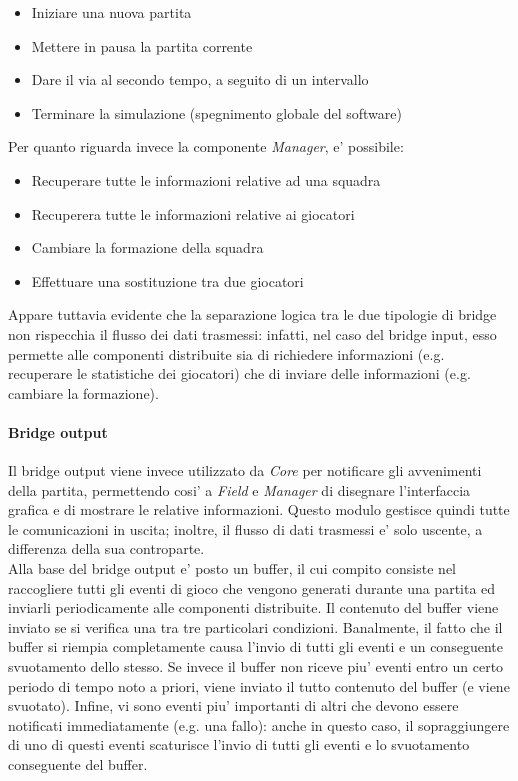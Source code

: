 \begin{itemize}
	\item Iniziare una nuova partita
	\item Mettere in pausa la partita corrente
	\item Dare il via al secondo tempo, a seguito di un intervallo
	\item Terminare la simulazione (spegnimento globale del software)
\end{itemize}

\noindent Per quanto riguarda invece la componente \textit{Manager}, e' possibile:

\begin{itemize}
	\item Recuperare tutte le informazioni relative ad una squadra
	\item Recuperera tutte le informazioni relative ai giocatori
	\item Cambiare la formazione della squadra
	\item Effettuare una sostituzione tra due giocatori
\end{itemize}

Appare tuttavia evidente che la separazione logica tra le due tipologie di bridge non rispecchia il flusso dei dati trasmessi: infatti, nel caso del bridge input, esso permette alle componenti distribuite sia di richiedere informazioni (e.g. recuperare le statistiche dei giocatori) che di inviare delle informazioni (e.g. cambiare la formazione).\\

\paragraph{Bridge output}\label{sec:analisi_distribuzione_bridge_output} Il bridge output viene invece utilizzato da \textit{Core} per notificare gli avvenimenti della partita, permettendo cosi' a \textit{Field} e \textit{Manager} di disegnare l'interfaccia grafica e di mostrare le relative informazioni. Questo modulo gestisce quindi tutte le comunicazioni in uscita; inoltre, il flusso di dati trasmessi e' solo uscente, a differenza della sua controparte.\\

Alla base del bridge output e' posto un buffer, il cui compito consiste nel raccogliere tutti gli eventi di gioco che vengono generati durante una partita ed inviarli periodicamente alle componenti distribuite. Il contenuto del buffer viene inviato se si verifica una tra tre particolari condizioni. Banalmente, il fatto che il buffer si riempia completamente causa l'invio di tutti gli eventi e un conseguente svuotamento dello stesso. Se invece il buffer non riceve piu' eventi entro un certo periodo di tempo noto a priori, viene inviato il tutto contenuto del buffer (e viene svuotato). Infine, vi sono eventi piu' importanti di altri che devono essere notificati immediatamente (e.g. una fallo): anche in questo caso, il sopraggiungere di uno di questi eventi scaturisce l'invio di tutti gli eventi e lo svuotamento conseguente del buffer.\\

